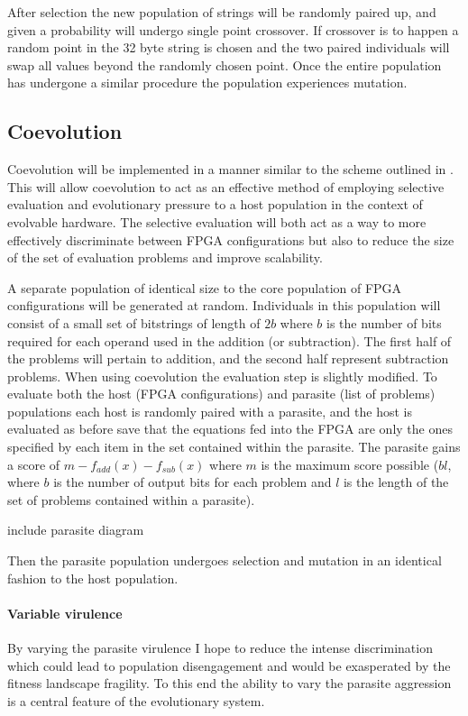 After selection the new population of strings will be randomly paired up, and given
a probability will undergo single point crossover. If crossover is to happen a
random point in the 32 byte string is chosen and the two paired individuals will
swap all values beyond the randomly chosen point. Once the entire population has
undergone a similar procedure the population experiences mutation.


\subsection{Coevolution}

Coevolution will be implemented in a manner similar to the scheme outlined in
\cite{6790490}.
This will allow coevolution to act as an effective method of employing selective
evaluation and evolutionary pressure to a host population in the context of
evolvable hardware. The selective evaluation will both act as a way to more effectively
discriminate between FPGA configurations but also to reduce the size of the
set of evaluation problems and improve scalability.

A separate population of identical size to the core population of FPGA configurations
will be generated at random. Individuals in this population will consist of a small set
of bitstrings of length of $2b$ where $b$ is the number of bits required for
each operand used in the addition (or subtraction). The first half of the problems
will pertain to addition, and the second half represent subtraction problems.
When using coevolution the
evaluation step is slightly modified. To evaluate both the host (FPGA
configurations) and parasite (list of problems) populations each host is randomly
paired with a parasite, and the host is evaluated as before save that the equations
fed into the FPGA are only the ones specified by each item in the set contained within
the parasite. The parasite gains a score of $m - f_{add}(x) - f_{sub}(x)$ where
$m$ is the maximum score possible ($bl$, where $b$ is the number of output bits for
each problem and $l$ is the length of the set of problems contained within a
parasite).

\todo include parasite diagram

Then the parasite population undergoes selection and mutation in an identical
fashion to the host population.

\paragraph{Variable virulence}
By varying the parasite virulence I hope to reduce the intense discrimination
which could lead to population disengagement and would be exasperated by the
fitness landscape fragility. To this end the ability to vary the parasite
aggression is a central feature of the evolutionary system.

